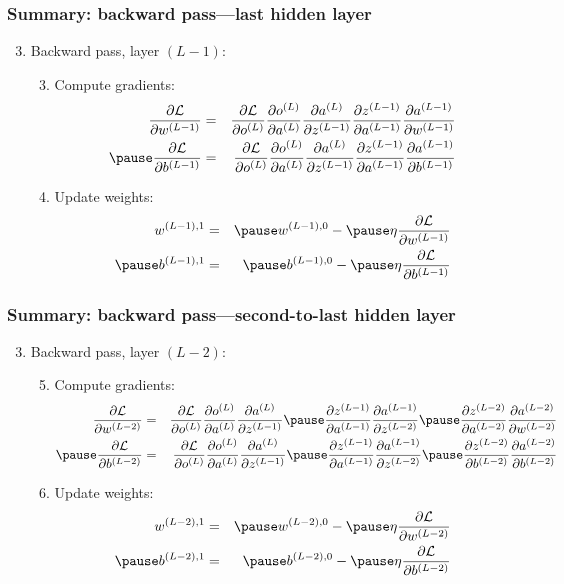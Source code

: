 \documentclass[smaller]{beamer}
\begin{document}
\begin{frame}
  \frametitle{Summary: backward pass---last hidden layer}
  \begin{enumerate}[<+->]\setcounter{enumi}{2}
  \item Backward pass, layer $(L-1)$:\pause
    \begin{enumerate}[<+->]\setcounter{enumii}{2}
    \item Compute gradients: \pause
    \begin{eqnarray}
      \pd{\mc{L}}{w^{(L-1)}} &=&  \pd{\mc{L}}{o^{(L)}}\pd{o^{(L)}}{a^{(L)}}\pd{a^{(L)}}{z^{(L-1)}}  \pd{z^{(L-1)}}{a^{(L-1)}}\pd{a^{(L-1)}}{w^{(L-1)}}\\\pause
      \pd{\mc{L}}{b^{(L-1)}} &=&   \pd{\mc{L}}{o^{(L)}}\pd{o^{(L)}}{a^{(L)}}\pd{a^{(L)}}{z^{(L-1)}}  \pd{z^{(L-1)}}{a^{(L-1)}}\pd{a^{(L-1)}}{b^{(L-1)}}
    \end{eqnarray}
    \pause
  \item Update weights: \pause
    \begin{eqnarray}
      w^{(L-1), 1}  &=& \pause  w^{(L-1),0} - \pause \eta \pd{\mc{L}}{w^{(L-1)}}  \\\pause
      b^{(L-1), 1}  &=&  \pause b^{(L-1),0} - \pause \eta \pd{\mc{L}}{b^{(L-1)}}  
    \end{eqnarray}
  \end{enumerate}
  \end{enumerate}
\end{frame}

\begin{frame}
  \frametitle{Summary: backward pass---second-to-last hidden layer}
  \begin{enumerate}[<+->]\setcounter{enumi}{2}
  \item Backward pass, layer $(L-2)$:\pause
    \begin{enumerate}[<+->] \setcounter{enumii}{4}
    \item Compute gradients: \pause
    \begin{eqnarray}
      \pd{\mc{L}}{w^{(L-2)}} &=&  \pd{\mc{L}}{o^{(L)}}\pd{o^{(L)}}{a^{(L)}}\pd{a^{(L)}}{z^{(L-1)}} \pause
                        \pd{z^{(L-1)}}{a^{(L-1)}}\pd{a^{(L-1)}}{z^{(L-2)}} \pause
                        \pd{z^{(L-2)}}{a^{(L-2)}}\pd{a^{(L-2)}}{w^{(L-2)}}\\\pause
      \pd{\mc{L}}{b^{(L-2)}} &=&   \pd{\mc{L}}{o^{(L)}}\pd{o^{(L)}}{a^{(L)}}\pd{a^{(L)}}{z^{(L-1)}} \pause
                        \pd{z^{(L-1)}}{a^{(L-1)}}\pd{a^{(L-1)}}{z^{(L-2)}} \pause
                        \pd{z^{(L-2)}}{b^{(L-2)}}\pd{a^{(L-2)}}{b^{(L-2)}}
    \end{eqnarray}
    \pause
  \item Update weights: \pause
    \begin{eqnarray}
      w^{(L-2), 1}  &=& \pause  w^{(L-2),0} - \pause \eta \pd{\mc{L}}{w^{(L-2)}}  \\\pause
      b^{(L-2), 1}  &=&  \pause b^{(L-2),0} - \pause \eta \pd{\mc{L}}{b^{(L-2)}}  
    \end{eqnarray}
  \end{enumerate}
  \end{enumerate}
\end{frame}
\end{document}
